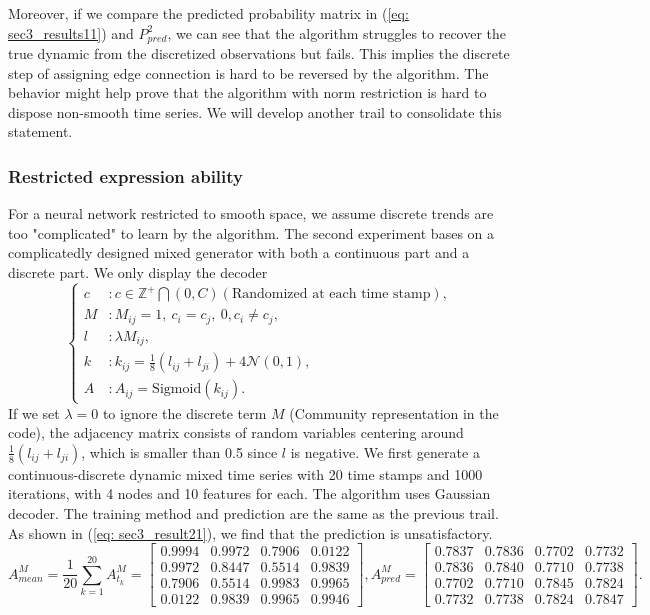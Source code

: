 Moreover, if we compare the predicted probability matrix in (\ref{eq: sec3_results11}) and $P^2_{pred}$, 
we can see that the algorithm struggles to recover the true dynamic from the discretized observations but fails.
This implies the discrete step of assigning edge connection is hard to be reversed by the algorithm. 
The behavior might help prove that the algorithm with norm restriction is hard to dispose non-smooth time series. 
We will develop another trail to consolidate this statement. 

\subsubsection{Restricted expression ability}
For a neural network restricted to smooth space, 
we assume discrete trends are too "complicated" to learn by the algorithm.
The second experiment bases on a complicatedly designed mixed generator with both a continuous part and a discrete part. 
We only display the decoder 
\begin{equation*}
    \left\{\begin{aligned}
        c &: c\in\mathbb{Z}^+\bigcap(0,C) (\text{Randomized at each time stamp}), \\
        M &: M_{ij}=1,\ c_i=c_j,\ 0, c_i\neq c_j, \\
        l &: \lambda M_{ij}, \\
        k &: k_{ij} = \frac{1}{8}(l_{ij}+l_{ji})+4\mathcal{N}(0,1), \\
        A &: A_{ij} = \mathrm{Sigmoid}(k_{ij}).
    \end{aligned}\right.
\end{equation*}
If we set $\lambda=0$ to ignore the discrete term $M$ (Community representation in the code),
the adjacency matrix consists of random variables centering around $\frac{1}{8}(l_{ij}+l_{ji})$, 
which is smaller than 0.5 since $l$ is negative. 
We first generate a continuous-discrete dynamic mixed time series with 20 time stamps and 1000 iterations, 
with 4 nodes and 10 features for each. 
The algorithm uses Gaussian decoder. The training method and prediction are the same as the previous trail. 
As shown in (\ref{eq: sec3_result21}), we find that the prediction is unsatisfactory. 
\begin{equation}
    \label{eq: sec3_result21}
    A^M_{mean}=\frac{1}{20}\sum_{k=1}^{20}A^M_{t_k}=\begin{bmatrix}
        0.9994& 0.9972& 0.7906& 0.0122 \\
        0.9972& 0.8447& 0.5514& 0.9839 \\
        0.7906& 0.5514& 0.9983& 0.9965 \\
        0.0122& 0.9839& 0.9965& 0.9946
    \end{bmatrix}, 
    A^M_{pred}=\begin{bmatrix}
        0.7837& 0.7836& 0.7702& 0.7732 \\
        0.7836& 0.7840& 0.7710& 0.7738 \\
        0.7702& 0.7710& 0.7845& 0.7824 \\
        0.7732& 0.7738& 0.7824& 0.7847
    \end{bmatrix}.
\end{equation}

